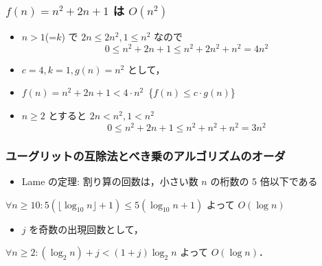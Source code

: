 \begin{frame}[shrink]
\frametitle{\(f(n)=n^2+2n+1\) は \(O(n^2)\)}
  \begin{itemize}
\item \(n>1\)(=\(k\)) で \(2n\leq 2n^2, 1\leq n^2\) なので
    \begin{displaymath}
0\leq n^2+2n+1\leq n^2+2n^2+n^2= 4n^2
    \end{displaymath}
\item \(c=4, k=1, g(n)=n^2\) として，
\item \(f(n)=n^2+2n+1<4\cdot n^2\)\ \textemdash\{\(f(n)\leq c\cdot g(n)\)\}
\item \(n\geq 2\) とすると \(2n<n^2, 1<n^2\) 
    \begin{displaymath}
0\leq n^2+2n+1\leq n^2+n^2+n^2= 3n^2
    \end{displaymath}
  \end{itemize}
\end{frame}
\begin{frame}[shrink]
\frametitle{ユーグリットの互除法とべき乗のアルゴリズムのオーダ}
  \begin{example}[ユーグリットの互除法]
    \begin{itemize}
\item Lame の定理: 割り算の回数は，小さい数 $n$ の桁数の 5 倍以下である
    \end{itemize}
\(\forall n\ge 10:5(\lfloor\log_{10}n\rfloor+1)\leq 5(\log_{10}n+1)\) よって \(O(\log n)\)
  \end{example}
  \begin{example}[べき乗]
    \begin{itemize}
\item $j$ を奇数の出現回数として，
    \end{itemize}
\(\forall n\ge2:(\log_2 n)+j<(1+j)\log_2 n\) よって \(O(\log n)\)．
  \end{example}
\end{frame}
